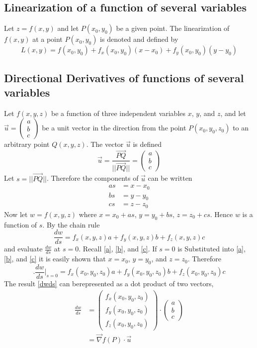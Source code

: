 \documentclass[14pt]{article}
\begin{document}
    \subsection{Linearization of a function of several variables}
    Let  $z=f(x,y)$ and let $P(x_0, y_0)$ be a given point. The linearization of $f(x,y)$ at a point $P(x_0, y_0)$ is denoted and defined by
    $$L(x,y)=f(x_0,y_0)+f_x(x_0, y_0)(x-x_0)+f_y(x_0, y_0)(y-y_0)$$
    \subsection{Directional Derivatives of functions of several variables}
    Let $f(x,y,z)$ be a function of three independent variables $x$, $y$, and $z$, and let $\vec u=\begin{pmatrix}a\\b\\c\end{pmatrix}$ be a unit vector in the direction from the point $P(x_0, y_0, z_0)$ to an arbitrary point $Q(x,y,z)$. The vector $\vec u$ is defined
    $$\vec u=\frac{\vec{PQ}}{||\vec {PQ}||}=\begin{pmatrix}a\\b\\c\end{pmatrix}$$
    Let $s=||\vec{PQ}||$. Therefore the components of $\vec u$ can be written
    \begin{align}
        as&=x-x_0\label{a}\\
        bs&=y-y_0\label{b}\\
        cs&=z-z_0\label{c}
    \end{align}
    Now let $w=f(x,y,z)$ where $x=x_0+as$, $y=y_0+bs$, $z=z_0+cs$. Hence $w$ is a function of $s$. By the chain rule
    $$\frac{dw}{ds}=f_x(x,y,z)a+f_y(x,y,z)b+f_z(x,y,z)c$$
    and evaluate $\frac{dw}{ds}$ at $s=0$. Recall \eqref{a}, \eqref{b}, and \eqref{c}. If $s=0$ is Substituted into \eqref{a}, \eqref{b}, and \eqref{c} it is easily shown that $x=x_0$, $y=y_0$, and $z=z_0$. Therefore
    \begin{equation}\label{dwds}
        \bigg. \frac{dw}{ds}\bigg|_{s=0}=f_x(x_0,y_0,z_0)a+f_y(x_0,y_0,z_0)b+f_z(x_0,y_0,z_0)c
    \end{equation}
    The result \eqref{dwds} can berepresented as a dot product of two vectors,
    \begin{align*}
        \frac{dw}{ds}&=\begin{pmatrix}f_x(x_0, y_0, z_0)\\f_y(x_0, y_0, z_0)\\f_z(x_0, y_0, z_0)\end{pmatrix}\cdot\begin{pmatrix}a\\b\\c\end{pmatrix}\\
        &=\vec\nabla f(P)\cdot \vec u
    \end{align*}
\end{document}
